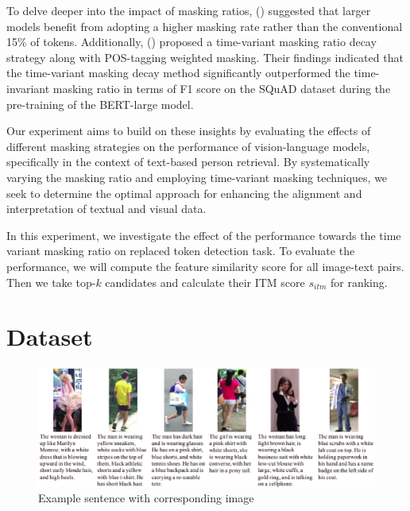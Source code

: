 To delve deeper into the impact of masking ratios, (\cite{wettig-etal-2023-mask}) suggested that larger models benefit from adopting a higher masking rate rather than the  conventional 15\% of tokens. Additionally, (\cite{yang2023learningbettermaskingbetter}) proposed a time-variant masking ratio decay strategy along with POS-tagging weighted masking. Their findings indicated that the time-variant masking decay method significantly outperformed the time-invariant masking ratio in terms of F1 score on the SQuAD dataset during the pre-training of the BERT-large model.

Our experiment aims to build on these insights by evaluating the effects of different masking strategies on the performance of vision-language models, specifically in the context of text-based person retrieval. By systematically varying the masking ratio and employing time-variant masking techniques, we seek to determine the optimal approach for enhancing the alignment and interpretation of textual and visual data.

In this experiment, we investigate the effect of the performance towards the time variant masking ratio on replaced token detection task. To evaluate the performance, we will compute the feature similarity score for all image-text pairs. Then we take top-$k$ candidates and calculate their ITM score $s_{itm}$ for ranking. 

\section{Dataset}

\begin{figure}[htbp]
  \begin{center}
      \includegraphics[width=\linewidth]{img/cuhk_pedes.eps}
      \caption{Example sentence with corresponding image}
      \label{fig:cuhk_pedes}
  \end{center}
\end{figure}


